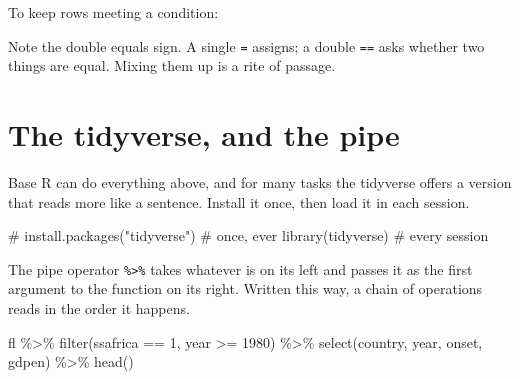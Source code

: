 \documentclass[
  a4paper,
]{scrbook}
\newenvironment{Shaded}{\begin{snugshade}}{\end{snugshade}}
\newcommand{\CommentTok}[1]{\textcolor[rgb]{0.37,0.37,0.37}{#1}}
\newcommand{\DecValTok}[1]{\textcolor[rgb]{0.68,0.00,0.00}{#1}}
\newcommand{\FunctionTok}[1]{\textcolor[rgb]{0.28,0.35,0.67}{#1}}
\newcommand{\NormalTok}[1]{\textcolor[rgb]{0.00,0.23,0.31}{#1}}
\newcommand{\OtherTok}[1]{\textcolor[rgb]{0.00,0.23,0.31}{#1}}
\newcommand{\SpecialCharTok}[1]{\textcolor[rgb]{0.37,0.37,0.37}{#1}}
\begin{document}
To keep rows meeting a condition:

\begin{Shaded}
\end{Shaded}

Note the double equals sign. A single \texttt{=} assigns; a double
\texttt{==} asks whether two things are equal. Mixing them up is a rite
of passage.

\section*{The tidyverse, and the pipe}\label{the-tidyverse-and-the-pipe}


Base R can do everything above, and for many tasks the tidyverse offers
a version that reads more like a sentence. Install it once, then load it
in each session.

\begin{Shaded}
\begin{Highlighting}[]
\CommentTok{\# install.packages("tidyverse")   \# once, ever}
\FunctionTok{library}\NormalTok{(tidyverse)                }\CommentTok{\# every session}
\end{Highlighting}
\end{Shaded}

The pipe operator \texttt{\%\textgreater{}\%} takes whatever is on its
left and passes it as the first argument to the function on its right.
Written this way, a chain of operations reads in the order it happens.

\begin{Shaded}
\begin{Highlighting}[]
\NormalTok{fl }\SpecialCharTok{\%\textgreater{}\%}
  \FunctionTok{filter}\NormalTok{(ssafrica }\SpecialCharTok{==} \DecValTok{1}\NormalTok{, year }\SpecialCharTok{\textgreater{}=} \DecValTok{1980}\NormalTok{) }\SpecialCharTok{\%\textgreater{}\%}
  \FunctionTok{select}\NormalTok{(country, year, onset, gdpen) }\SpecialCharTok{\%\textgreater{}\%}
  \FunctionTok{head}\NormalTok{()}
\end{Highlighting}
\end{Shaded}
\end{document}
